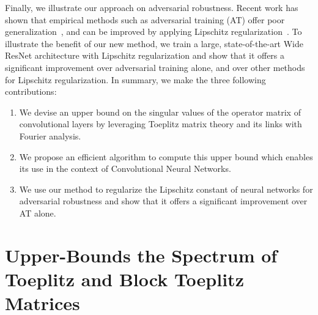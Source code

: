 Finally, we illustrate our approach on adversarial robustness.
Recent work has shown that empirical methods such as adversarial training (AT) offer poor generalization~\cite{schmidt2018adversarially}, and can be improved by applying Lipschitz regularization~\cite{farnia2018generalizable}.
To illustrate the benefit of our new method, we train a large, state-of-the-art Wide ResNet architecture with Lipschitz regularization and show that it offers a significant improvement over adversarial training alone, and over other methods for Lipschitz regularization.
In summary, we make the three following contributions:
\begin{enumerate}
  \item We devise an upper bound on the singular values of the operator matrix of convolutional layers by leveraging Toeplitz matrix theory and its links with Fourier analysis.
  \item We propose an efficient algorithm to compute this upper bound which enables its use in the context of Convolutional Neural Networks.
  \item We use our method to regularize the Lipschitz constant of neural networks for adversarial robustness and show that it offers a significant improvement over AT alone.
\end{enumerate}


\section{Upper-Bounds the Spectrum of Toeplitz and Block Toeplitz Matrices}

